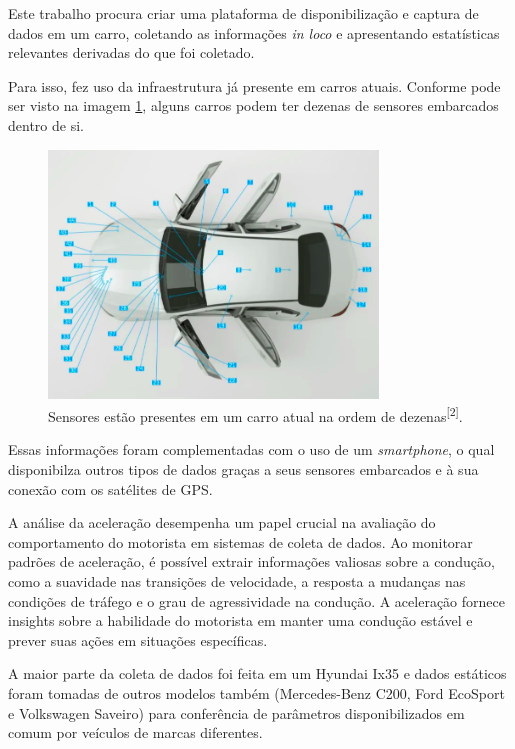 Este trabalho procura criar uma plataforma de disponibilização e captura de dados em um carro, coletando as informações \textit{in loco} e apresentando estatísticas relevantes derivadas do que foi coletado.

Para isso, fez uso da infraestrutura já presente em carros atuais. Conforme pode ser visto na imagem \ref{fig:sensors_car}, alguns carros podem ter dezenas de sensores embarcados dentro de si.


\begin{figure}[hp]
    \centering
    
    \includegraphics[]{figures/sensores_carro.png}
    
    \caption{Sensores estão presentes em um carro atual na ordem de dezenas\textsuperscript{[2]}.}
    
    \label{fig:sensors_car}
\end{figure}

Essas informações foram complementadas com o uso de um \textit{smartphone}, o qual disponibilza outros tipos de dados graças a seus sensores embarcados e à sua conexão com os satélites de GPS.

A análise da aceleração desempenha um papel crucial na avaliação do comportamento do motorista em sistemas de coleta de dados. Ao monitorar padrões de aceleração, é possível extrair informações valiosas sobre a condução, como a suavidade nas transições de velocidade, a resposta a mudanças nas condições de tráfego e o grau de agressividade na condução. A aceleração fornece insights sobre a habilidade do motorista em manter uma condução estável e prever suas ações em situações específicas. 

A maior parte da coleta de dados foi feita em um Hyundai Ix35 e dados estáticos foram tomadas de outros modelos também (Mercedes-Benz C200, Ford EcoSport e Volkswagen Saveiro) para conferência de parâmetros disponibilizados em comum por veículos de marcas diferentes.

